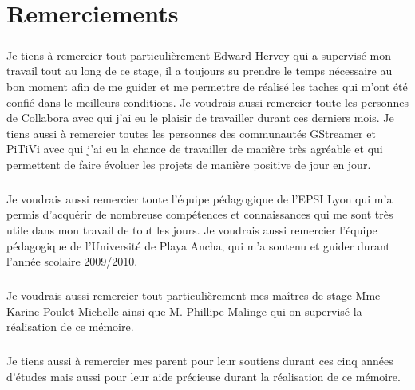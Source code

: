\newpage \chapter*{Remerciements}

\paragraph {}

Je tiens à remercier tout particulièrement Edward Hervey qui a
supervisé mon travail tout au long de ce stage, il a toujours su prendre
le temps nécessaire au bon moment afin de me guider et me permettre
de réalisé les taches qui m'ont été confié dans le meilleurs
conditions. Je voudrais aussi remercier toute les personnes de Collabora
avec qui j'ai eu le plaisir de travailler durant ces derniers mois.
Je tiens aussi à remercier toutes les personnes des communautés GStreamer
et PiTiVi avec qui j'ai eu la chance de travailler de manière très
agréable et qui permettent de faire évoluer les projets de manière
positive de jour en jour.

\paragraph {}

Je voudrais aussi remercier toute l'équipe pédagogique de l'EPSI Lyon
qui m'a permis d'acquérir de nombreuse compétences et connaissances
qui me sont très utile dans mon travail de tout les jours. Je voudrais
aussi remercier l'équipe pédagogique de l'Université de Playa Ancha,
qui m'a soutenu et guider durant l'année scolaire 2009/2010.

\paragraph {}

Je voudrais aussi remercier tout particulièrement mes maîtres de
stage Mme Karine Poulet Michelle ainsi que M. Phillipe Malinge qui on
supervisé la réalisation de ce mémoire.

\paragraph {}

Je tiens aussi à remercier mes parent pour leur soutiens durant ces
cinq années d'études mais aussi pour leur aide précieuse durant la
réalisation de ce mémoire.
